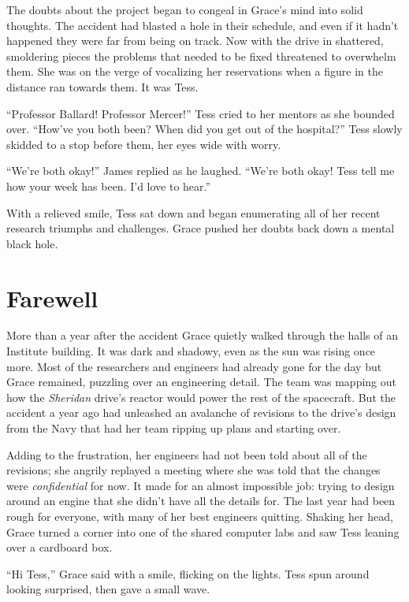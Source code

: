 \documentclass[openany, 12pt]{book} %
\begin{document}
The doubts about the project began to congeal in Grace's mind into solid thoughts. The accident had blasted a hole in their schedule, and even if it hadn't happened they were far from being on track. Now with the drive in shattered, smoldering pieces the problems that needed to be fixed threatened to overwhelm them. She was on the verge of vocalizing her reservations when a figure in the distance ran towards them. It was Tess.

``Professor Ballard! Professor Mercer!'' Tess cried to her mentors as she bounded over. ``How've you both been? When did you get out of the hospital?'' Tess slowly skidded to a stop before them, her eyes wide with worry.

``We're both okay!'' James replied as he laughed. ``We're both okay! Tess tell me how your week has been. I'd love to hear.''

With a relieved smile, Tess sat down and began enumerating all of her recent research triumphs and challenges. Grace pushed her doubts back down a mental black hole.

\chapter{Farewell}

More than a year after the accident Grace quietly walked through the halls of an Institute building. It was dark and shadowy, even as the sun was rising once more. Most of the researchers and engineers had already gone for the day but Grace remained, puzzling over an engineering detail. The team was mapping out how the \textit{Sheridan} drive's reactor would power the rest of the spacecraft. But the accident a year ago had unleashed an avalanche of revisions to the drive's design from the Navy that had her team ripping up plans and starting over. 

Adding to the frustration, her engineers had not been told about all of the revisions; she angrily replayed a meeting where she was told that the changes were \textit{confidential} for now. It made for an almost impossible job: trying to design around an engine that she didn't have all the details for. The last year had been rough for everyone, with many of her best engineers quitting. Shaking her head, Grace turned a corner into one of the shared computer labs and saw Tess leaning over a cardboard box.

``Hi Tess,'' Grace said with a smile, flicking on the lights. Tess spun around looking surprised, then gave a small wave. 
\end{document}
